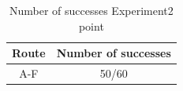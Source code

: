   
  \begin{table}[htb]
    \centering
    \caption{Number of successes Experiment2 point}
    \begin{tabular}{|c|c|}
    \hline
    Route & Number of successes \\ \hline
    A-F     & 50/60                  \\ \hline
    \end{tabular}
    \label{tb::exp2suc}
    \end{table} 